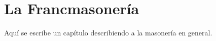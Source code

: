 \chapter{La Francmasonería}
\label{chapter:Francmasoneria}

Aquí se escribe un capítulo describiendo a la masonería en general.